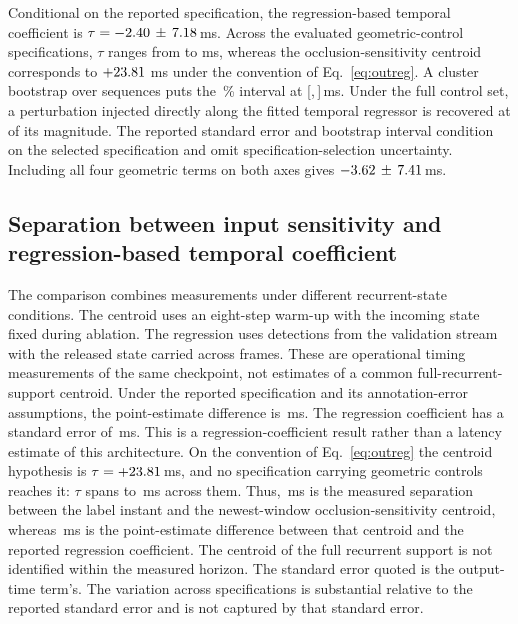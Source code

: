 \documentclass[10pt,twocolumn,letterpaper]{article}
\begin{document}
Conditional on the reported specification, the regression-based temporal coefficient is
$\tau=-2.40\,\pm\,7.18$\,ms. Across the evaluated
geometric-control specifications, $\tau$ ranges from \satLo{} to \satHi{} ms,
whereas the occlusion-sensitivity centroid corresponds to
$+23.81$ ms under the convention of Eq.~\ref{eq:outreg}. A
cluster bootstrap over sequences puts the \bootCI\,\% interval at
[\outBootLo,\,\outBootHi]\,ms. Under the full control set, a perturbation injected directly along
the fitted temporal regressor is recovered at \injRecovery{} of its magnitude.
The reported standard error and bootstrap interval condition on the selected
specification and omit specification-selection uncertainty.
Including all four geometric terms on both axes gives
$-3.62\,\pm\,7.41$\,ms.

\subsection{Separation between input sensitivity and regression-based temporal coefficient}
\label{sec:extrapolation}

The comparison combines measurements under different recurrent-state conditions.
The centroid uses an eight-step warm-up with the incoming state fixed during
ablation. The regression uses detections from the validation stream with the
released state carried across frames. These are operational timing measurements
of the same checkpoint, not estimates of a common full-recurrent-support
centroid. Under the reported specification and its
annotation-error assumptions, the point-estimate difference is \outInterval\,ms. The regression
coefficient has a standard error of \outIntervalSE\,ms. This is a regression-coefficient
result rather than a latency estimate of this architecture. On the
convention of Eq.~\ref{eq:outreg} the centroid
hypothesis is $\tau=+23.81$\,ms, and no specification carrying
geometric controls reaches it: $\tau$ spans \satLo{} to \satHi\,ms across them.
Thus, \rvtCentroidMagMeas\,ms is the measured separation between the label
instant and the newest-window occlusion-sensitivity centroid, whereas \outInterval\,ms
is the point-estimate difference between that centroid and the reported regression
coefficient. The centroid of the full
recurrent support is not identified within the measured horizon. The standard
error quoted is the output-time term's. The variation across specifications is substantial
relative to the reported standard error and is not captured by that standard error.
\end{document}
